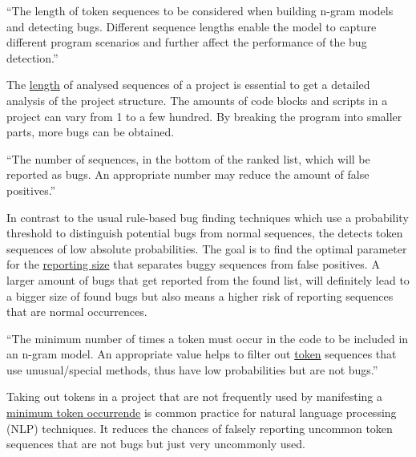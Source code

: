 \begin{definition}\label{def:sequence_length}
    ``The length of token sequences to be considered when building n-gram models and detecting bugs. Different sequence lengths enable the model to capture different program scenarios and further affect the performance of the bug detection.''~\cite{bugram}
\end{definition}

The \hyperref[def:sequence_length]{length} of analysed sequences of a project is essential to get a detailed analysis of the project structure. The amounts of code blocks and scripts in a \scratch{} project can vary from 1 to a few hundred. By breaking the program into smaller parts, more bugs can be obtained.

\begin{definition}\label{def:reporting_size}
    ``The number of sequences, in the bottom of the ranked list, which will be reported as bugs. An appropriate number may reduce the amount of false positives.''~\cite{bugram}
\end{definition}

In contrast to the usual rule-based bug finding techniques which use a probability threshold to distinguish potential bugs from normal sequences, the \ngram{} detects token sequences of low absolute probabilities. The goal is to find the optimal parameter for the \hyperref[def:reporting_size]{reporting size} that separates buggy sequences from false positives. A larger amount of bugs that get reported from the found list, will definitely lead to a bigger size of found bugs but also means a higher risk of reporting sequences that are normal occurrences.

\begin{definition}\label{def:minimum_token_occurrence}
    ``The minimum number of times a token must occur in the code to be included in an n-gram model. An appropriate value helps to filter out \hyperref[def:token]{token} sequences that use unusual/special methods, thus have low probabilities but are not bugs.''~\cite{bugram}
\end{definition}

Taking out tokens in a project that are not frequently used by manifesting a \hyperref[def:minimum_token_occurrence]{minimum token occurrende} is common practice for natural language processing (NLP) techniques. It reduces the chances of falsely reporting uncommon token sequences that are not bugs but just very uncommonly used. 

